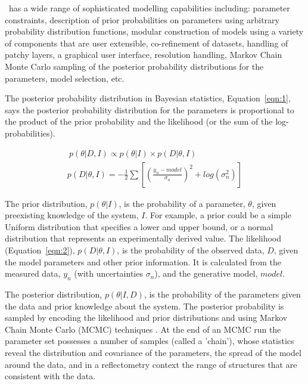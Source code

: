 \documentclass[12pt]{article}
\begin{document}
\ has a wide range of sophisticated modelling capabilities including: parameter constraints, description of prior probabilities on parameters using arbitrary probability distribution functions, modular construction of models using a variety of components that are user extensible, co-refinement of datasets, handling of patchy layers, a graphical user interface, resolution handling, Markov Chain Monte Carlo sampling of the posterior probability distributions for the parameters, model selection, etc.

The posterior probability distribution in Bayesian statistics, Equation~\ref{eqn:1}, says the posterior probability distribution for the parameters is proportional to the product of the prior probability and the likelihood (or the sum of the log-probabilities).

\begin{gather} 
\label{eqn:1}\ p(\theta | D, I) \propto p(\theta | I)\times p(D | \theta, I)\\
p(D | \theta, I) = -\frac{1}{2} \sum \left[\left(\frac{y_n - model} {\sigma_n}\right)^2 + log(\sigma_n^2)\right]\label{eqn:2}
\end{gather}

The prior distribution, $p(\theta | I)$, is the probability of a parameter, $\theta$, given preexisting knowledge of the system, $I$. For example, a prior could be a simple Uniform distribution that specifies a lower and upper bound, or a normal distribution that represents an experimentally derived value.
The likelihood (Equation~\ref{eqn:2}), $p(D | \theta, I)$, is the probability of the observed data, $D$, given the model parameters and other prior information. It is calculated from the measured data, $y_n$ (with uncertainties $\sigma_n$), and the generative model, $model$.

The posterior distribution, $p(\theta | I, D)$, is the probability of the parameters given the data and prior knowledge about the system.  The posterior probability is sampled by encoding the likelihood and prior distributions and using Markov Chain Monte Carlo (MCMC) techniques \cite{emcee}. At the end of an MCMC run the parameter set possesses a number of samples (called a 'chain'), whose statistics reveal the distribution and covariance of the parameters, the spread of the model around the data, and in a reflectometry context the range of structures that are consistent with the data.
\end{document}
